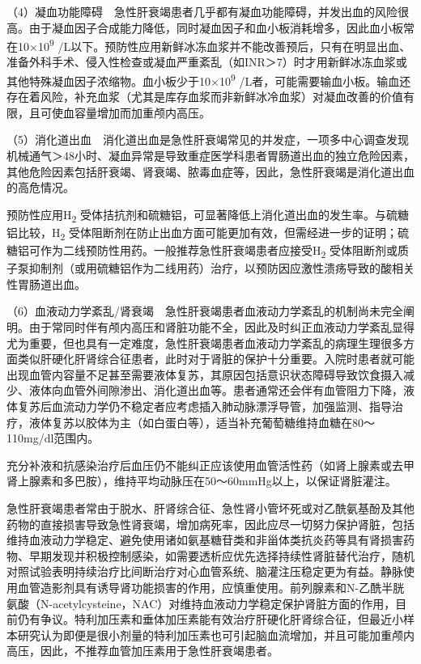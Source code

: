 （4）凝血功能障碍　急性肝衰竭患者几乎都有凝血功能障碍，并发出血的风险很高。由于凝血因子合成能力降低，同时凝血因子和血小板消耗增多，因此血小板常在10×10\textsuperscript{9}
/L以下。预防性应用新鲜冰冻血浆并不能改善预后，只有在明显出血、准备外科手术、侵入性检查或凝血严重紊乱（如INR＞7）时才用新鲜冰冻血浆或其他特殊凝血因子浓缩物。血小板少于10×10\textsuperscript{9}
/L者，可能需要输血小板。输血还存在着风险，补充血浆（尤其是库存血浆而非新鲜冰冷血浆）对凝血改善的价值有限，且可使血容量增加而加重颅内高压。

（5）消化道出血　消化道出血是急性肝衰竭常见的并发症，一项多中心调查发现机械通气＞48小时、凝血异常是导致重症医学科患者胃肠道出血的独立危险因素，其他危险因素包括肝衰竭、肾衰竭、脓毒血症等，因此，急性肝衰竭是消化道出血的高危情况。

预防性应用H\textsubscript{2}
受体拮抗剂和硫糖铝，可显著降低上消化道出血的发生率。与硫糖铝比较，H\textsubscript{2}
受体阻断剂在防止出血方面可能更加有效，但需经进一步的证明；硫糖铝可作为二线预防性用药。一般推荐急性肝衰竭患者应接受H\textsubscript{2}
受体阻断剂或质子泵抑制剂（或用硫糖铝作为二线用药）治疗，以预防因应激性溃疡导致的酸相关性胃肠道出血。

（6）血液动力学紊乱/肾衰竭　急性肝衰竭患者血液动力学紊乱的机制尚未完全阐明。由于常同时伴有颅内高压和肾脏功能不全，因此及时纠正血液动力学紊乱显得尤为重要，但也具有一定难度，急性肝衰竭患者血液动力学紊乱的病理生理很多方面类似肝硬化肝肾综合征患者，此时对于肾脏的保护十分重要。入院时患者就可能出现血管内容量不足甚至需要液体复苏，其原因包括意识状态障碍导致饮食摄入减少、液体向血管外间隙渗出、消化道出血等。患者通常还会伴有血管阻力下降，液体复苏后血流动力学仍不稳定者应考虑插入肺动脉漂浮导管，加强监测、指导治疗，液体复苏以胶体为主（如白蛋白等），适当补充葡萄糖维持血糖在80～110mg/dl范围内。

充分补液和抗感染治疗后血压仍不能纠正应该使用血管活性药（如肾上腺素或去甲肾上腺素和多巴胺），维持平均动脉压在50～60mmHg以上，以保证肾脏灌注。

急性肝衰竭患者常由于脱水、肝肾综合征、急性肾小管坏死或对乙酰氨基酚及其他药物的直接损害导致急性肾衰竭，增加病死率，因此应尽一切努力保护肾脏，包括维持血液动力学稳定、避免使用诸如氨基糖苷类和非甾体类抗炎药等具有肾损害药物、早期发现并积极控制感染，如需要透析应优先选择持续性肾脏替代治疗，随机对照试验表明持续治疗比间断治疗对心血管系统、脑灌注压稳定更为有益。静脉使用血管造影剂具有诱导肾功能损害的作用，应慎重使用。前列腺素和N-乙酰半胱氨酸（N-acetylcysteine，NAC）对维持血液动力学稳定保护肾脏方面的作用，目前仍有争议。特利加压素和垂体加压素能有效治疗肝硬化肝肾综合征，但最近小样本研究认为即便是很小剂量的特利加压素也可引起脑血流增加，并且可能加重颅内高压，因此，不推荐血管加压素用于急性肝衰竭患者。

